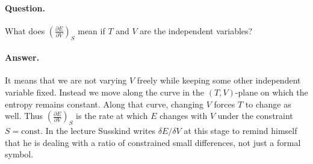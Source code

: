 \paragraph{Question.} What does \(\left(\frac{\partial E}{\partial V}\right)_S\) mean if \(T\) and \(V\) are the independent variables?

\paragraph{Answer.} It means that we are not varying \(V\) freely while keeping some other independent variable fixed. Instead we move along the curve in the \((T,V)\)-plane on which the entropy remains constant. Along that curve, changing \(V\) forces \(T\) to change as well. Thus \(\left(\frac{\partial E}{\partial V}\right)_S\) is the rate at which \(E\) changes with \(V\) under the constraint \(S=\mathrm{const}\). In the lecture Susskind writes \(\delta E/\delta V\) at this stage to remind himself that he is dealing with a ratio of constrained small differences, not just a formal symbol.

